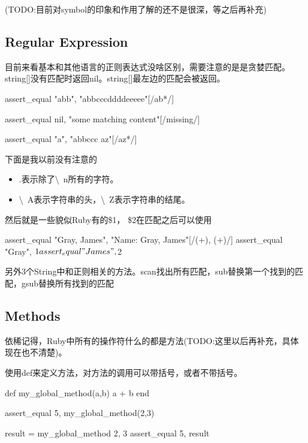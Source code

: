 (TODO:目前对symbol的印象和作用了解的还不是很深，等之后再补充)



\subsection{Regular Expression}
目前来看基本和其他语言的正则表达式没啥区别，需要注意的是是贪婪匹配。string[]没有匹配时返回nil。string[]最左边的匹配会被返回。
\begin{Ruby}
	assert_equal "abb", "abbcccddddeeeee"[/ab*/]

    assert_equal nil, "some matching content"[/missing/]
    
    assert_equal "a", "abbccc az"[/az*/]
\end{Ruby}

下面是我以前没有注意的
\begin{itemize}
\item .表示除了\textbackslash\ n所有的字符。
\item \textbackslash\ A表示字符串的头，\textbackslash\ Z表示字符串的结尾。
\end{itemize}

然后就是一些貌似Ruby有的\$1， \$2在匹配之后可以使用
\begin{Ruby}
    assert_equal "Gray, James", "Name:  Gray, James"[/(\w+), (\w+)/]
    assert_equal "Gray", $1
    assert_equal "James", $2
\end{Ruby}

另外3个String中和正则相关的方法。scan找出所有匹配，sub替换第一个找到的匹配，gsub替换所有找到的匹配


\subsection{Methods}
依稀记得，Ruby中所有的操作符什么的都是方法(TODO:这里以后再补充，具体现在也不清楚)。

使用def来定义方法，对方法的调用可以带括号，或者不带括号。
\begin{Ruby}
	def my_global_method(a,b)
  		a + b
	end

	assert_equal 5, my_global_method(2,3)	
	
	result = my_global_method 2, 3
    assert_equal 5, result
\end{Ruby}

